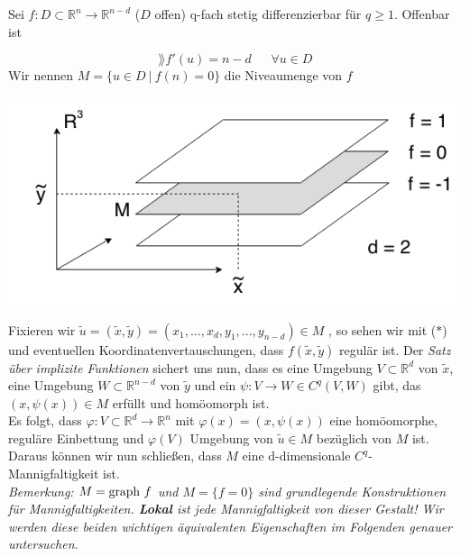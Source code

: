 \begin{beispiel}
Sei $f:D\subset\mathbb{R}^n\rightarrow\mathbb{R}^{n-d}$ ($D$ offen) q-fach stetig differenzierbar für $q\geq 1$. Offenbar ist

\begin{equation*}
\rang f'(u)=n-d \ \ \ \ \ \ \ \forall u\in D
\tag{$\ast$}
\end{equation*}
Wir nennen $M=\{u\in D \ | \ f(n)=0\}$ die Niveaumenge von $f$\\

\begin{center}\includegraphics[scale=0.5]{pictures/001-09}\\
\end{center}

Fixieren wir $\tilde{u}=(\tilde{x},\tilde{y})=(x_1,...,x_d,y_1,...,y_{n-d})\in M$
, so sehen wir mit ($\ast$) und eventuellen Koordinatenvertauschungen, dass 
$f(\tilde{x},\tilde{y})$ regulär ist. Der \emph{Satz über implizite Funktionen}
sichert uns nun, dass es eine Umgebung $V\subset\mathbb{R}^d$ von $\tilde{x}$, 
eine Umgebung $W\subset\mathbb{R}^{n-d}$ von $\tilde{y}$ und ein 
$\psi:V\rightarrow W\in C^q(V,W)$ gibt, das $(x,\psi(x))\in M$ erfüllt und homöomorph ist.\\
Es folgt, dass $\varphi:V\subset\mathbb{R}^d\rightarrow\mathbb{R}^n$ mit
$\varphi(x)=(x,\psi(x))$ eine homöomorphe, reguläre Einbettung  und $\varphi(V)$ 
Umgebung von $\tilde{u}\in M$ bezüglich von $M$ ist. Daraus können wir nun schließen, 
dass $M$ eine d-dimensionale $C^q$-Mannigfaltigkeit ist.\\
\linebreak
\emph{Bemerkung: $M=\text{graph\ } f$ und $M=\{f=0\}$ sind grundlegende Konstruktionen 
für Mannigfaltigkeiten. \textbf{Lokal} ist jede Mannigfaltigkeit von dieser Gestalt! Wir werden diese beiden wichtigen äquivalenten Eigenschaften im Folgenden genauer untersuchen.}
\end{beispiel}
